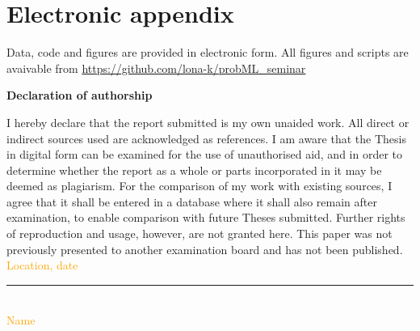 \documentclass[12pt]{article}
\begin{document}
\section{Electronic appendix}
\label{sec:el_app}

Data, code and figures are provided in electronic form. All figures and scripts are avaivable from \url{https://github.com/lona-k/probML_seminar}

\newpage


\RaggedRight


\newpage


\Large
\noindent
\textbf{Declaration of authorship}
\vspace{0.5cm}
\noindent
\normalsize

I hereby declare that the report submitted is my own unaided work. All direct
or indirect sources used are acknowledged as references. I am aware that the
Thesis in digital form can be examined for the use of unauthorised aid, and in
order to determine whether the report as a whole or parts incorporated in it may
be deemed as plagiarism. For the comparison of my work with existing sources, I
agree that it shall be entered in a database where it shall also remain after
examination, to enable comparison with future Theses submitted. Further rights
of reproduction and usage, however, are not granted here. This paper was not
previously presented to another examination board and has not been published.
\\

\vspace{1cm}
\textcolor{orange}{Location, date} \\

\vspace{3cm}

\noindent\rule{0.5\textwidth}{0.4pt} \\

\textcolor{orange}{Name}

\end{document}
